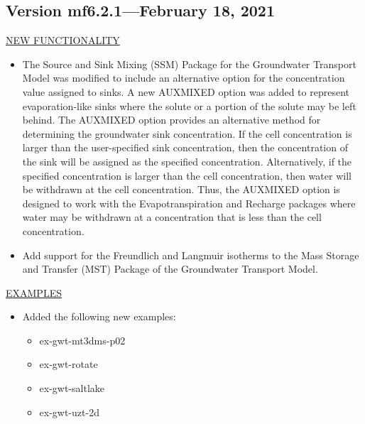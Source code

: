 	\subsection{Version mf6.2.1---February 18, 2021}

	\underline{NEW FUNCTIONALITY}
	\begin{itemize}
	        \item The Source and Sink Mixing (SSM) Package for the Groundwater Transport Model was modified to include an alternative option for the concentration value assigned to sinks.  A new AUXMIXED option was added to represent evaporation-like sinks where the solute or a portion of the solute may be left behind.  The AUXMIXED option provides an alternative method for determining the groundwater sink concentration.  If the cell concentration is larger than the user-specified sink concentration, then the concentration of the sink will be assigned as the specified concentration.  Alternatively, if the specified concentration is larger than the cell concentration, then water will be withdrawn at the cell concentration.  Thus, the AUXMIXED option is designed to work with the Evapotranspiration and Recharge packages where water may be withdrawn at a concentration that is less than the cell concentration.  
	        \item Add support for the Freundlich and Langmuir isotherms to the Mass Storage and Transfer (MST) Package of the Groundwater Transport Model.
	\end{itemize}
	
	\underline{EXAMPLES}
	\begin{itemize}
	        \item Added the following new examples: 
	        \begin{itemize}
	          \item ex-gwt-mt3dms-p02
	          \item ex-gwt-rotate
	          \item ex-gwt-saltlake
	          \item ex-gwt-uzt-2d
	        \end{itemize}
	\end{itemize}

